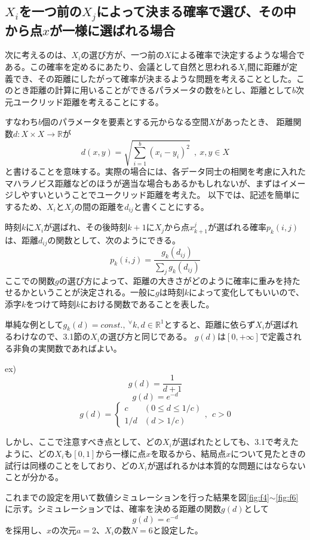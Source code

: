 \subsection{$X_{i}$を一つ前の$X_{j}$によって決まる確率で選び、その中から点$x$が一様に選ばれる場合}

次に考えるのは、$X_{i}$の選び方が、一つ前の$X$による確率で決定するような場合である。この確率を定めるにあたり、会議として自然と思われる$X_{i}$間に距離が定義でき、その距離にしたがって確率が決まるような問題を考えることとした。このとき距離の計算に用いることができるパラメータの数を$b$とし、距離として$b$次元ユークリッド距離を考えることにする。

すなわち$b$個のパラメータを要素とする元からなる空間$X$があったとき、
距離関数$d: X \times X \rightarrow \mathbb{R}$が
$$d(x, y) = \sqrt{\sum_{i=1}^{b}(x_{i}-y_{i})^{2}}\ \ ,\ x,y\in X$$
と書けることを意味する。実際の場合には、各データ同士の相関を考慮に入れたマハラノビス距離などのほうが適当な場合もあるかもしれないが、まずはイメージしやすいということでユークリッド距離を考えた。
以下では、記述を簡単にするため、$X_{i}$と$X_{j}$の間の距離を$d_{ij}$と書くことにする。

時刻$k$に$X_{i}$が選ばれ、その後時刻$k+1$に$X_{j}$から点$x_{k+1}^{j}$が選ばれる確率$p_{k}(i,j)$は、距離$d_{ij}$の関数として、次のようにできる。
$$p_{k}(i,j) = \frac{g_{k}(d_{ij})}{\sum_{j} g_{k}(d_{ij})}$$
ここでの関数$g$の選び方によって、距離の大きさがどのように確率に重みを持たせるかということが決定される。一般に$g$は時刻$k$によって変化してもいいので、添字$k$をつけて時刻$k$における関数であることを表した。

単純な例として$g_{k}(d) = const.,\ ^{\forall}k, d\in \mathbb{R}^{1}$とすると、距離に依らず$X_{i}$が選ばれるわけなので、3.1節の$X_{i}$の選び方と同じである。
$g(d)$は$[0, +\infty]$で定義される非負の実関数であればよい。

ex)
$$g(d) = \frac{1}{d+1}$$
$$g(d) = e^{-d}$$
$$g(d) = \left\{ \begin{array}{ll} c & (0\le d \le 1/c) \nonumber\\
1/d & (d>1/c)\end{array}\right., \ \ c>0$$

しかし、ここで注意すべき点として、どの$X_{i}$が選ばれたとしても、3.1で考えたように、どの$X_{i}$も$[0,1]$から一様に点$x$を取るから、結局点$x$について見たときの試行は同様のことをしており、どの$X_{i}$が選ばれるかは本質的な問題にはならないことが分かる。

これまでの設定を用いて数値シミュレーションを行った結果を図\ref{fig:f4}$\sim$\ref{fig:f6}に示す。シミュレーションでは、確率を決める距離の関数$g(d)$として
$$g(d) = e^{-d}$$
を採用し、$x$の次元$a=2$、$X_{i}$の数$N=6$と設定した。

